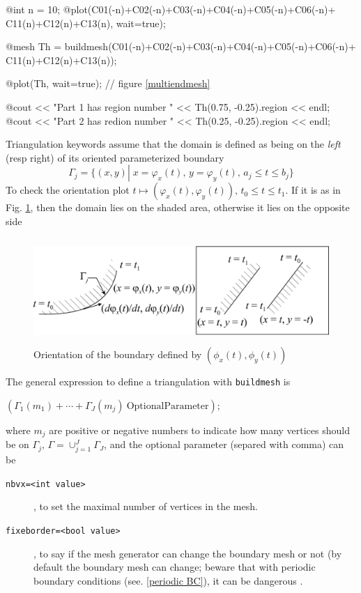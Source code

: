 \documentclass[a4paper,twoside,12pt]{book}
\begin{document}
@int n = 10;
@plot(C01(-n)+C02(-n)+C03(-n)+C04(-n)+C05(-n)+C06(-n)+
      C11(n)+C12(n)+C13(n), wait=true);

@mesh Th = buildmesh(C01(-n)+C02(-n)+C03(-n)+C04(-n)+C05(-n)+C06(-n)+
      C11(n)+C12(n)+C13(n));

@plot(Th, wait=true); // figure \ref{multiendmesh}

@cout << "Part 1 has region number " << Th(0.75, -0.25).region << endl;
@cout << "Part 2 has redion number " << Th(0.25, -0.25).region << endl;
\eFF


Triangulation keywords assume that the domain is defined as being on the \emph{left} (resp right) of its
oriented parameterized boundary
$$
\Gamma_j=\{(x,y)\left|\; x=\varphi_x(t),\, y=\varphi_y(t),\, a_j\le t\le b_j\right.\}
$$
To check the orientation plot
$t\mapsto (\varphi_x(t),\varphi_y(t)),\, t_0\le t\le t_1$.
If it is as in Fig. \ref{fig:border}, then
the domain lies on the shaded area, otherwise it lies on the opposite side


\begin{figure}[htbp]
\begin{center}
  \includegraphics[height=4cm]{border}
\end{center}
  \caption{Orientation of the boundary defined by $(\phi_x(t),\phi_y(t))$
  \label{fig:border}} 
\end{figure}
The general expression to define a triangulation with \texttt{buildmesh} is
\begin{center}
$\left(\Gamma_1(m_1)+\cdots+\Gamma_J(m_j) \mathrm{~OptionalParameter} \right)$;
\end{center}
where $m_j$ are positive or negative numbers to indicate how many vertices should be on $\Gamma_j,\,
\Gamma=\cup_{j=1}^J \Gamma_J$, and the optional parameter (separed with comma) can be
\begin{description}
\item[\texttt{nbvx=<int value>}] ,  to set the maximal number of  vertices in the mesh.
\item[\texttt{fixeborder=<bool value>}] , to say if the mesh generator can change the boundary mesh
or not (by default the boundary mesh can change; beware that with periodic boundary conditions 
(see. \ref{periodic BC}), it can be dangerous .\label{buildmesh fixeborder}
\end{description}
\end{document}
